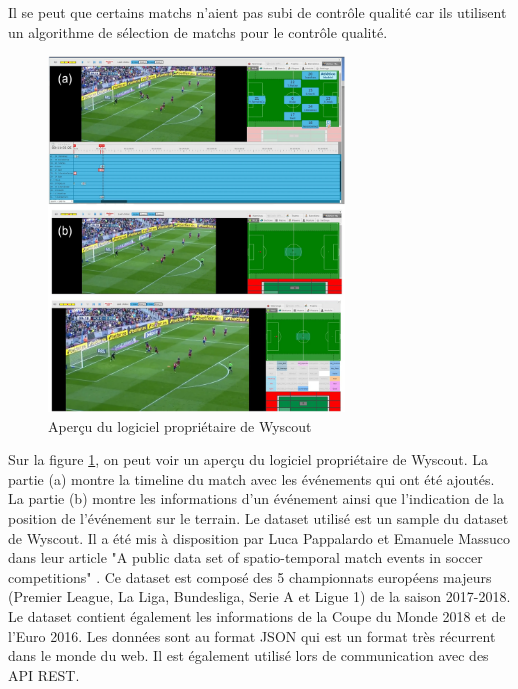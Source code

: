 \documentclass[12pt]{article}
\begin{document}
Il se peut que certains matchs n'aient pas subi de contrôle qualité car ils utilisent un algorithme de sélection de matchs pour le contrôle qualité.
\begin{figure}[t]
    \centering
    \includegraphics[width=0.7\textwidth]{img/logiciel_proprietaire.png}
    \caption{Aperçu du logiciel propriétaire de Wyscout}
    \label{fig:logiciel_proprietaire}
\end{figure}
Sur la figure \ref{fig:logiciel_proprietaire}, on peut voir un aperçu du logiciel propriétaire de Wyscout.
La partie (a) montre la timeline du match avec les événements qui ont été ajoutés.
La partie (b) montre les informations d'un événement ainsi que l'indication de la position de l'événement sur le terrain.
\newline\newline
Le dataset utilisé est un sample du dataset de Wyscout. 
Il a été mis à disposition par Luca Pappalardo et Emanuele Massuco dans leur article "A public data set of spatio-temporal match events in soccer competitions" \cite{pappalardoPublicDataSet2019}.
\newline
Ce dataset est composé des 5 championnats européens majeurs (Premier League, La Liga, Bundesliga, Serie A et Ligue 1) de la saison 2017-2018. 
Le dataset contient également les informations de la Coupe du Monde 2018 et de l'Euro 2016.
Les données sont au format JSON qui est un format très récurrent dans le monde du web. Il est également utilisé lors de communication avec des API REST.
\end{document}

